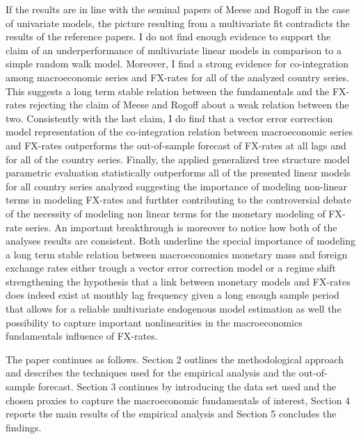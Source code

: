 If the results are in line with the seminal papers of Meese and Rogoff
in the case of univariate models, the picture resulting from a
multivariate fit contradicts the results of the reference papers. I do
not find enough evidence to support the claim of an underperformance
of multivariate linear models in comparison to a simple random walk
model. Moreover, I find a strong evidence for co-integration among
macroeconomic series and FX-rates for all of the analyzed country
series. This suggests a long term stable relation between the
fundamentals and the FX-rates rejecting the claim of Meese and Rogoff
about a weak relation between the two. Consistently with the last
claim, I do find that a vector error correction model representation
of the co-integration relation between macroeconomic series and
FX-rates outperforms the out-of-sample forecast of FX-rates at all
lags and for all of the country series. Finally, the applied
generalized tree structure model parametric evaluation statistically
outperforms all of the presented linear models for all country series
analyzed suggesting the importance of modeling non-linear terms in
modeling FX-rates and furthter contributing to the controversial debate of
the necessity of modeling non linear terms for the monetary modeling
of FX-rate series. An important breakthrough is moreover to notice
how both of the analyses results are consistent. Both underline
the special importance of modeling a long term stable
relation between macroeconomics monetary mass and foreign exchange
rates either trough a vector error correction model or a regime shift
strengthening the hypothesis that a link between monetary
models and FX-rates does indeed exist at monthly lag frequency given a
long enough sample period that allows for a reliable multivariate
endogenous model estimation as well the possibility to capture
important nonlinearities in the macroeconomics fundamentals influence
of FX-rates.

The paper continues as follows. Section 2 outlines the methodological
approach and describes the techniques used for the empirical analysis
and the out-of-sample forecast. Section 3 continues by introducing the
data set used and the chosen proxies to capture the macroeconomic
fundamentals of interest, Section 4 reports the main results of the
empirical analysis and Section 5 concludes the findings.
